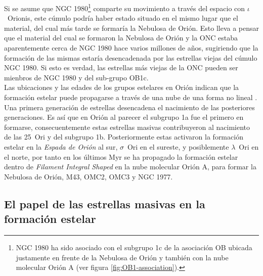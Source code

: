 Si se asume que NGC 1980\footnote{NGC 1980 ha sido asociado con el subgrupo 1c de la asociación OB ubicada justamente en frente de la Nebulosa de Orión y también con la nube molecular Orión A (ver figura \ref{fig:OB1-association}).} comparte su movimiento a través del espacio con \(\iota\)~Orionis, este cúmulo podría haber estado situado en el mismo lugar que el material, del cual más tarde se formaría la Nebulosa de Orión. Esto lleva a pensar que el material del cual se formaron la Nebulosa de Orión y la ONC estaba aparentemente cerca de NGC 1980 hace varios millones de años, sugiriendo que la formación de las mismas estaría desencadenada por las estrellas viejas del cúmulo NGC 1980. Si esto es verdad, las estrellas más viejas de la ONC pueden ser mienbros de NGC 1980 y del sub-grupo OB1c.\\

Las ubicaciones y las edades de los grupos estelares en Orión indican que la formación estelar puede propagarse a través de una nube de una forma no lineal \citep{Bally:2008a}. Una primera generación de estrellas desencadena el nacimiento de las posteriores generaciones. Es así que en Orión al parecer el subgrupo 1a fue el primero en formarse, consecuentemente estas estrellas masivas contribuyeron al nacimiento de las 25~Ori y del subgrupo 1b. Posteriormente estas activaron la formación estelar en la \textit{Espada de Orión} al sur, \(\sigma\)~Ori en el sureste, y posiblemente \(\lambda\)~Ori en el norte, por tanto en los últimos Myr se ha propagado la formación estelar dentro de \textit{Filament Integral Shaped} en la nube molecular Orión A, para formar la Nebulosa de Orión, M43, OMC2, OMC3 y NGC 1977.\\ 

\subsection{El papel de las estrellas masivas en la formación estelar}
\label{sec:star-masivas}

